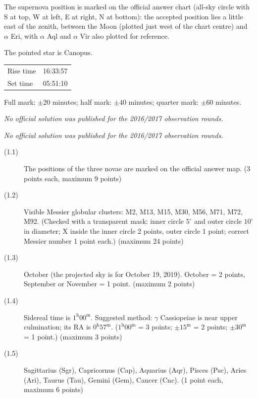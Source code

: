 
The supernova position is marked on the official answer chart (all-sky
circle with S at top, W at left, E at right, N at bottom): the accepted
position lies a little east of the zenith, between the Moon (plotted just
west of the chart centre) and $\alpha$ Eri, with $\alpha$ Aql and
$\alpha$ Vir also plotted for reference.


The pointed star is Canopus.

\begin{center}
\begin{tabular}{ll}
Rise time & 16:33:57 \\
Set time & 05:51:10 \\
\end{tabular}
\end{center}

Full mark: $\pm 20$ minutes; half mark: $\pm 40$ minutes; quarter mark:
$\pm 60$ minutes.

\textit{No official solution was published for the 2016/2017 observation rounds.}

\textit{No official solution was published for the 2016/2017 observation rounds.}

\begin{description}
\item[(1.1)] The positions of the three novae are marked on the official
  answer map. \hfill(3 points each, maximum 9 points)
\item[(1.2)] Visible Messier globular clusters: M2, M13, M15, M30, M56,
  M71, M72, M92. (Checked with a transparent mask: inner circle $5^\circ$ and
  outer circle $10^\circ$ in diameter; X inside the inner circle 2 points,
  outer circle 1 point; correct Messier number 1 point each.)
  \hfill(maximum 24 points)
\item[(1.3)] October (the projected sky is for October 19, 2019).
  October = 2 points, September or November = 1 point.
  \hfill(maximum 2 points)
\item[(1.4)] Sidereal time is $1^{\mathrm{h}}00^{\mathrm{m}}$. Suggested
  method: $\gamma$ Cassiopeiae is near upper culmination; its RA is
  $0^{\mathrm{h}}57^{\mathrm{m}}$.
  ($1^{\mathrm{h}}00^{\mathrm{m}}$ = 3 points; $\pm 15^{\mathrm{m}}$ = 2
  points; $\pm 30^{\mathrm{m}}$ = 1 point.) \hfill(maximum 3 points)
\item[(1.5)] Sagittarius (Sgr), Capricornus (Cap), Aquarius (Aqr), Pisces
  (Psc), Aries (Ari), Taurus (Tau), Gemini (Gem), Cancer (Cnc).
  \hfill(1 point each, maximum 6 points)
\end{description}

